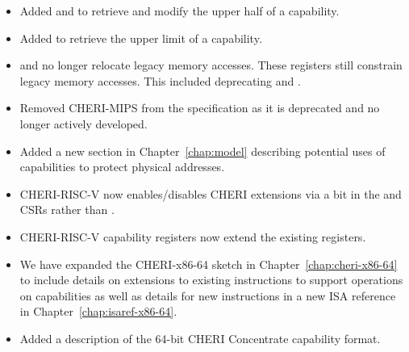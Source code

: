 \begin{itemize}
\item Added  and  to retrieve and
  modify the upper half of a capability.

\item Added  to retrieve the upper limit of a
  capability.

\item \DDC{} and \PCC{} no longer relocate legacy memory accesses.
  These registers still constrain legacy memory accesses.  This
  included deprecating  and .

\item Removed CHERI-MIPS from the specification as it is deprecated
  and no longer actively developed.

\item Added a new section in Chapter~\ref{chap:model} describing
  potential uses of capabilities to protect physical addresses.

\item CHERI-RISC-V now enables/disables CHERI extensions via a bit in
  the \menvcfg{} and \senvcfg{} CSRs rather than \xccsr{}.

\item CHERI-RISC-V \xScratchC{} capability registers now extend the
  existing \xscratch{} registers.

\item We have expanded the CHERI-x86-64 sketch in
  Chapter~\ref{chap:cheri-x86-64} to include details on extensions to
  existing instructions to support operations on capabilities as well
  as details for new instructions in a new ISA reference in
  Chapter~\ref{chap:isaref-x86-64}.

\item Added a description of the 64-bit CHERI Concentrate capability
  format.
\end{itemize}
